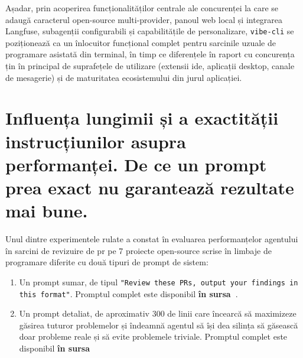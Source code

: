\documentclass[12pt, a4paper, oneside, romanian]{teza-upb}
\begin{document}
    Așadar, prin acoperirea funcționalităților centrale ale concurenței la care se adaugă caracterul open-source multi-provider, panoul web local și integrarea Langfuse, subagenții configurabili și capabilitățile de personalizare, \texttt{vibe-cli} se poziționează ca un înlocuitor funcțional complet pentru sarcinile uzuale de programare asistată din terminal, în timp ce diferențele în raport cu concurența țin în principal de suprafețele de utilizare (extensii \ac{ide}, aplicații desktop, canale de mesagerie) și de maturitatea ecosistemului din jurul aplicației.

  \section{Influența lungimii și a exactității instrucțiunilor asupra performanței. De ce un prompt prea exact nu garantează rezultate mai bune.}

    Unul dintre experimentele rulate a constat în evaluarea performanțelor agentului în sarcini de revizuire de \ac{pr} pe 7 proiecte open-source scrise în limbaje de programare diferite cu două tipuri de prompt de sistem:

    \begin{enumerate}
      \item Un prompt sumar, de tipul \texttt{"Review these PRs, output your findings in this format"}. Promptul complet este disponibil \textbf{în sursa~\cite{gist_pr_review}}.
      \item Un prompt detaliat, de aproximativ 300 de linii care încearcă să maximizeze găsirea tuturor problemelor și îndeamnă agentul să își dea silința să găsească doar probleme reale și să evite
      problemele triviale. Promptul complet este disponibil \textbf{în sursa~\cite{gist_pr_review_full}}
    \end{enumerate}
\end{document}

